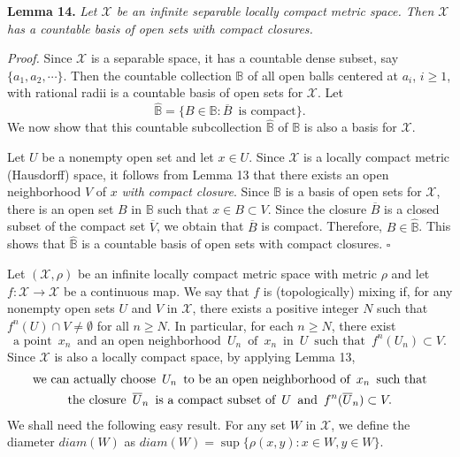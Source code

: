 \documentclass[12pt]{article}
\newcommand{\ov}{\overline}
\newcommand{\sq}{$\square$}
\begin{document}
\noindent
{\bf Lemma 14.}
{\it Let $\mathcal X$ be an infinite separable locally compact metric space.  Then $\mathcal X$ has a countable basis of open sets with compact closures.}

\noindent
{\it Proof.}
Since $\mathcal X$ is a separable space, it has a countable dense subset, say $\{ a_1, a_2, \cdots \}$.  Then the countable collection $\mathbb B$ of all open balls centered at $a_i$, $i \ge 1$, with rational radii is a countable basis of open sets for $\mathcal X$.  Let {\large $$\widehat {\mathbb B} = \{ B \in \mathbb B: \ov B \,\,\, \text{is compact} \}.$$}\indent We now show that this countable subcollection $\widehat {\mathbb B}$ of $\mathbb B$ is also a basis for $\mathcal X$. 

Let $U$ be a nonempty open set and let $x \in U$.  Since $\mathcal X$ is a locally compact metric (Hausdorff) space, it follows from Lemma 13 that there exists an open neighborhood $V$ of $x$ {\it with compact closure}.  Since $\mathbb B$ is a basis of open sets for $\mathcal X$, there is an open set $B$ in $\mathbb B$ such that $x \in B \subset V$.  Since the closure $\ov B$ is a closed subset of the compact set $\ov V$, we obtain that $\ov B$ is compact.  Therefore, $B \in \widehat {\mathbb B}$.  This shows that $\widehat {\mathbb B}$ is a countable basis of open sets with compact closures.  
\hfill\sq

Let $(\mathcal X, \rho)$ be an infinite locally compact metric space with metric $\rho$ and let $f : \mathcal X \rightarrow \mathcal X$ be a continuous map.  We say that $f$ is (topologically) mixing if, for any nonempty open sets $U$ and $V$ in $\mathcal X$, there exists a positive integer $N$ such that $f^n(U) \cap V \ne \emptyset$ for all $n \ge N$.  In particular, for each $n \ge N$, there exist $$\text{a point} \,\,\, x_n \,\,\, \text{and an open neighborhood} \,\,\, U_n \,\,\, \text{of} \,\,\, x_n \,\,\, \text{in} \,\,\, U \,\,\, \text{such that} \,\,\, f^n(U_n) \subset V.$$  Since $\mathcal X$ is also a locally compact space, by applying Lemma 13, 
\begin{multline*}
$$
\text{we can actually choose} \,\,\, U_n \,\,\, \text{to be an open neighborhood of} \,\,\, x_n \,\,\, \text{such that} \\
\text{the closure} \,\,\, \overline U_n \,\,\, \text{is a compact subset of} \,\,\, U \,\,\, \text{and} \,\,\, f^n(\overline U_n) \subset V.
$$
\end{multline*}
\indent We shall need the following easy result.  For any set $W$ in $\mathcal X$, we define the diameter $diam(W)$ as $diam(W) = \sup \{ \rho(x, y): x \in W, y \in W \}$.
\end{document}
